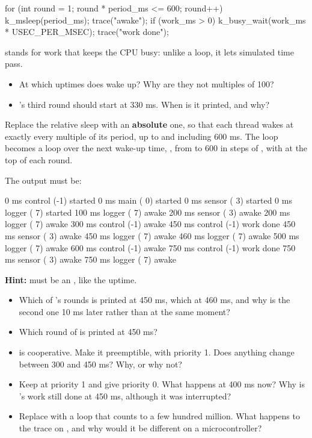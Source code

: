 \begin{ccode}
for (int round = 1; round * period_ms <= 600; round++) {
	k_msleep(period_ms);
	trace("awake");
	if (work_ms > 0) {
		k_busy_wait(work_ms * USEC_PER_MSEC);
		trace("work done");
	}
}
\end{ccode}

 stands for work that keeps the CPU busy: unlike a loop, it lets simulated time
pass.

\begin{itemize}
  \item At which uptimes does  wake up? Why are they not multiples of 100?
  \item {}’s third round should start at 330 ms. When is it printed, and why?
\end{itemize}

\label{c3:ex:1.3}

Replace the relative sleep with an \textbf{absolute} one, so that each thread wakes at exactly every
multiple of its period, up to and including 600 ms. The loop becomes a loop over the next wake-up
time, , from  to 600 in steps of , with
 at the top of each round.

The output must be:

\begin{console}
   0 ms  control (-1)  started
   0 ms  main    ( 0)  started
   0 ms  sensor  ( 3)  started
   0 ms  logger  ( 7)  started
 100 ms  logger  ( 7)  awake
 200 ms  sensor  ( 3)  awake
 200 ms  logger  ( 7)  awake
 300 ms  control (-1)  awake
 450 ms  control (-1)  work done
 450 ms  sensor  ( 3)  awake
 450 ms  logger  ( 7)  awake
 460 ms  logger  ( 7)  awake
 500 ms  logger  ( 7)  awake
 600 ms  control (-1)  awake
 750 ms  control (-1)  work done
 750 ms  sensor  ( 3)  awake
 750 ms  logger  ( 7)  awake
\end{console}

\textbf{Hint:}  must be an , like the uptime.

\begin{itemize}
  \item Which of ’s rounds is printed at 450 ms, which at 460 ms, and why is the second one 10
    ms later rather than at the same moment?
  \item Which round of  is printed at 450 ms?
  \item {} is cooperative. Make it preemptible, with priority 1. Does anything change between
    300 and 450 ms? Why, or why not?
  \item Keep  at priority 1 and give  priority 0. What happens at 400 ms now? Why
    is ’s work still done at 450 ms, although it was interrupted?
  \item Replace  with a  loop that counts to a few hundred million. What
    happens to the trace on , and why would it be different on a microcontroller?
\end{itemize}

